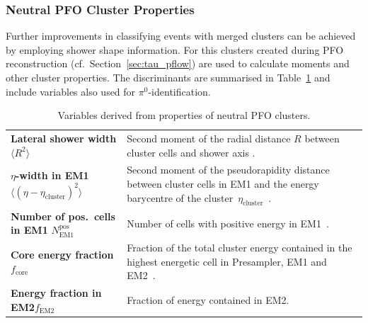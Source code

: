 \subsubsection{Neutral PFO Cluster Properties}

Further improvements in classifying events with merged clusters can be achieved
by employing shower shape information. For this clusters created during PFO
reconstruction (cf.\ Section~\ref{sec:tau_pflow}) are used to calculate moments
and other cluster properties.
The discriminants are summarised in Table~\ref{tab:cluster_variables} and
include variables also used for $\pi^0$-identification.

\begin{table}[htb]
  \centering
  {\def\arraystretch{1.4}\small
  \begin{tabular}{p{4.5cm}p{9cm}}
    \toprule
    \textbf{Lateral shower width}\newline$\langle R^2 \rangle$ &
    Second moment of the radial distance $R$ between cluster cells and shower axis \cite{atlas_topoclustering}. \\

    \textbf{$\eta$-width in EM1}\newline$\langle (\eta - \eta_\text{cluster})^2\rangle$ &
    Second moment of the pseudorapidity distance between cluster cells in EM1
    and the energy barycentre of the cluster~$\eta_\text{cluster}$~\cite{atlas:taurec:decaymodes}. \\

    \textbf{Number of pos.\ cells in EM1} $N_\text{EM1}^\text{pos}$ &
    Number of cells with positive energy in EM1~\cite{atlas:taurec:decaymodes}.\\

    \textbf{Core energy fraction}\newline$f_\text{core}$ &
    Fraction of the total cluster energy contained in the highest energetic cell
    in Presampler, EM1 and EM2~\cite{atlas_topoclustering}. \\

    \textbf{Energy fraction in EM2}\newline$f_\text{EM2}$ &
    Fraction of energy contained in EM2.\\
    \bottomrule
  \end{tabular}
  }
  \caption{Variables derived from properties of neutral PFO clusters.}
  \label{tab:cluster_variables}
\end{table}

